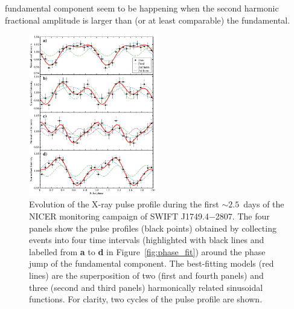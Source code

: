 \documentclass[fleqn,usenatbib]{mnras}
\newcommand{\swiftj}{SWIFT J1749.4$-$2807}
\newcommand{\nicer}{NICER}
\begin{document}
fundamental component seem to be happening when the second harmonic fractional amplitude is larger than (or at least comparable) the fundamental.   


\begin{figure}
\centering
\includegraphics[width=0.5\textwidth]{best_profile}
\caption{Evolution of the X-ray pulse profile during the first $\sim 2.5$~days of the \nicer{} monitoring campaign of \swiftj{}. The four panels show the pulse profiles (black points) obtained by collecting events into four time intervals (highlighted with black lines and labelled from \textbf{a} to \textbf{d} in Figure~\ref{fig:phase_fit}) around the phase jump of the fundamental component. The best-fitting models (red lines) are the superposition of two (first and fourth panels) and three (second and third panels) harmonically related sinusoidal functions. For clarity, two cycles of the pulse profile are shown.}
\label{fig:profile_evo}
\end{figure} 
\end{document}
